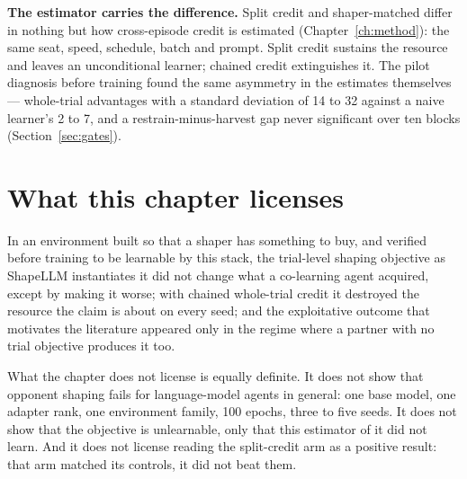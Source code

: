 

\textbf{The estimator carries the difference.} Split credit and
shaper-matched differ in nothing but how cross-episode credit is estimated
(Chapter~\ref{ch:method}): the same seat, speed, schedule, batch and prompt.
Split credit sustains the resource and leaves an unconditional learner;
chained credit extinguishes it.
The pilot diagnosis before training found the same asymmetry in the
estimates themselves --- whole-trial advantages with a standard deviation of
14 to 32 against a naive learner's 2 to 7, and a restrain-minus-harvest gap
never significant over ten blocks (Section~\ref{sec:gates}).

\section{What this chapter licenses}
\label{sec:res-licenses}

In an environment built so that a shaper has something to buy, and
verified before training to be learnable by this stack, the trial-level
shaping objective as ShapeLLM instantiates it did not change what a
co-learning agent acquired, except by making it worse; with chained
whole-trial credit it destroyed the resource the claim is about on every
seed; and the exploitative outcome that motivates the literature appeared
only in the regime where a partner with no trial objective produces it too.

What the chapter does not license is equally definite.
It does not show that opponent shaping fails for language-model agents in
general: one base model, one adapter rank, one environment family, 100
epochs, three to five seeds.
It does not show that the objective is unlearnable, only that this estimator
of it did not learn.
And it does not license reading the split-credit arm as a positive result:
that arm matched its controls, it did not beat them.
